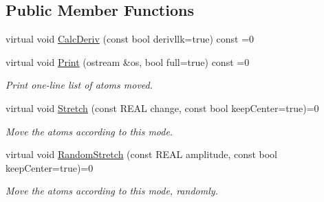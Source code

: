 \subsection*{Public Member Functions}
\begin{DoxyCompactItemize}
\item 
virtual void \mbox{\hyperlink{struct_obj_cryst_1_1_stretch_mode_a5b5ab5f9819c047a49719a330722d419}{Calc\+Deriv}} (const bool derivllk=true) const =0
\item 
\mbox{\label{struct_obj_cryst_1_1_stretch_mode_a78c180042fce5981fe0e97071d986362}} 
virtual void \mbox{\hyperlink{struct_obj_cryst_1_1_stretch_mode_a78c180042fce5981fe0e97071d986362}{Print}} (ostream \&os, bool full=true) const =0
\begin{DoxyCompactList}\small\item\em Print one-\/line list of atoms moved. \end{DoxyCompactList}\item 
\mbox{\label{struct_obj_cryst_1_1_stretch_mode_a289eef038fd0e5aaddb8097c55692ffe}} 
virtual void \mbox{\hyperlink{struct_obj_cryst_1_1_stretch_mode_a289eef038fd0e5aaddb8097c55692ffe}{Stretch}} (const R\+E\+AL change, const bool keep\+Center=true)=0
\begin{DoxyCompactList}\small\item\em Move the atoms according to this mode. \end{DoxyCompactList}\item 
\mbox{\label{struct_obj_cryst_1_1_stretch_mode_a18db484818754a913f025ffd1c547b47}} 
virtual void \mbox{\hyperlink{struct_obj_cryst_1_1_stretch_mode_a18db484818754a913f025ffd1c547b47}{Random\+Stretch}} (const R\+E\+AL amplitude, const bool keep\+Center=true)=0
\begin{DoxyCompactList}\small\item\em Move the atoms according to this mode, randomly. \end{DoxyCompactList}\end{DoxyCompactItemize}
